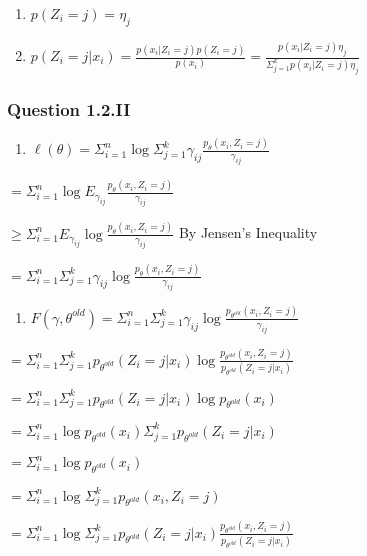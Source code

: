 \documentclass[
]{article}
\providecommand{\tightlist}{%
  \setlength{\itemsep}{0pt}\setlength{\parskip}{0pt}}
\begin{document}
\begin{enumerate}
\def\labelenumi{\alph{enumi})}
\item
  \(p(Z_i = j) = \eta_j\)
\item
  \(p(Z_i = j | x_i) = \frac{p(x_i | Z_i = j)p(Z_i = j)}{p(x_i)} = \frac{p(x_i | Z_i = j)\eta_j}{\Sigma_{j=1}^k p(x_i | Z_i = j)\eta_j}\)
\end{enumerate}

\hypertarget{question-1.2.ii}{%
\subsubsection{Question 1.2.II}\label{question-1.2.ii}}

\begin{enumerate}
\def\labelenumi{\alph{enumi})}
\setcounter{enumi}{2}
\tightlist
\item
  \(\ell(\theta) = \Sigma_{i=1}^n \log \Sigma_{j=1}^k \gamma_{ij}\frac{p_\theta(x_i, Z_i = j)}{\gamma_{ij}}\)
\end{enumerate}

\(= \Sigma_{i=1}^n \log E_{\gamma_{ij}}\frac{p_\theta(x_i, Z_i = j)}{\gamma_{ij}}\)

\(\geq \Sigma_{i=1}^n E_{\gamma_{ij}} \log \frac{p_\theta(x_i, Z_i = j)}{\gamma_{ij}}\)
By Jensen's Inequality

\(= \Sigma_{i=1}^n \Sigma_{j=1}^k \gamma_{ij} \log \frac{p_\theta(x_i, Z_i = j)}{\gamma_{ij}}\)

\begin{enumerate}
\def\labelenumi{\alph{enumi})}
\setcounter{enumi}{3}
\tightlist
\item
  \(F(\gamma, \theta^{old}) = \Sigma_{i=1}^n \Sigma_{j=1}^k \gamma_{ij} \log \frac{p_{\theta^{old}}(x_i, Z_i = j)}{\gamma_{ij}}\)
\end{enumerate}

\(= \Sigma_{i=1}^n \Sigma_{j=1}^k p_{\theta^{old}}(Z_i = j | x_i) \log \frac{p_{\theta^{old}}(x_i, Z_i = j)}{ p_{\theta^{old}}(Z_i = j | x_i)}\)

\(= \Sigma_{i=1}^n \Sigma_{j=1}^k p_{\theta^{old}}(Z_i = j | x_i) \log p_{\theta^{old}}(x_i)\)

\(= \Sigma_{i=1}^n \log p_{\theta^{old}}(x_i) \Sigma_{j=1}^k p_{\theta^{old}}(Z_i = j | x_i)\)

\(= \Sigma_{i=1}^n \log p_{\theta^{old}}(x_i)\)

\(= \Sigma_{i=1}^n \log \Sigma_{j=1}^k p_{\theta^{old}}(x_i, Z_i = j)\)

\(= \Sigma_{i=1}^n \log \Sigma_{j=1}^k p_{\theta^{old}}(Z_i = j | x_i)\frac{p_{\theta^{old}}(x_i, Z_i = j)}{p_{\theta^{old}}(Z_i = j | x_i)}\)
\end{document}
